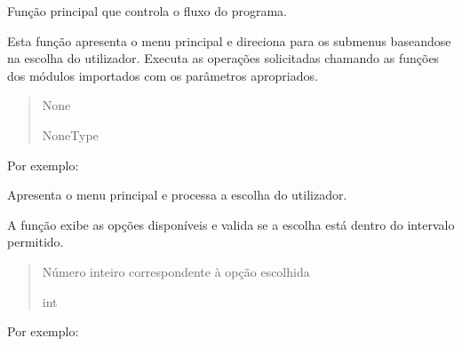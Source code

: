 \documentclass[letterpaper,10pt,portuges]{sphinxmanual}
\begin{document}
\begin{fulllineitems}
\label{\detokenize{main:main.main}}
\pysigstartsignatures
\pysiglinewithargsret
{}
{}
{}
\pysigstopsignatures
\sphinxAtStartPar
Função principal que controla o fluxo do programa.

\sphinxAtStartPar
Esta função apresenta o menu principal e direciona para os submenus
baseando\sphinxhyphen{}se na escolha do utilizador. Executa as operações
solicitadas chamando as funções dos módulos importados com os
parâmetros apropriados.
\begin{quote}\begin{description}
\sphinxAtStartPar
None

\sphinxAtStartPar
NoneType

\end{description}\end{quote}

\sphinxAtStartPar
Por exemplo:

\begin{sphinxVerbatim}[commandchars=\\\{\}]
\end{sphinxVerbatim}

\end{fulllineitems}


\begin{fulllineitems}
\label{\detokenize{main:main.menu}}
\pysigstartsignatures
\pysiglinewithargsret
{}
{}
{}
\pysigstopsignatures
\sphinxAtStartPar
Apresenta o menu principal e processa a escolha do utilizador.

\sphinxAtStartPar
A função exibe as opções disponíveis e valida se a escolha está
dentro do intervalo permitido.
\begin{quote}\begin{description}
\sphinxAtStartPar
Número inteiro correspondente à opção escolhida

\sphinxAtStartPar
int

\end{description}\end{quote}

\sphinxAtStartPar
Por exemplo:

\begin{sphinxVerbatim}[commandchars=\\\{\}]
\end{sphinxVerbatim}

\end{fulllineitems}
\end{document}
